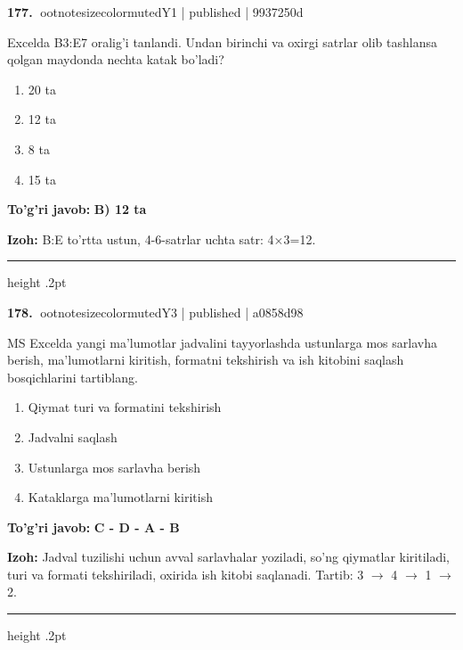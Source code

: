 \documentclass[10pt,a4paper]{article}
\begin{document}
\textbf{\color{ink}177.} {ootnotesizecolor{muted}Y1 | published | 9937250d}
\par
Excelda B3:E7 oralig'i tanlandi. Undan birinchi va oxirgi satrlar olib tashlansa qolgan maydonda nechta katak bo'ladi?
\begin{enumerate}[label=\Alph*),leftmargin=9mm]
\item 20 ta
\item 12 ta
\item 8 ta
\item 15 ta
\end{enumerate}
\begin{tcolorbox}[enhanced,breakable,colback=teal!4,colframe=teal!55!black,boxrule=0.45pt,arc=1.2mm,left=2.8mm,right=2.8mm,top=2mm,bottom=2mm]
\textbf{\color{teal}To'g'ri javob:} \textbf{B) 12 ta}
\par\smallskip
\textbf{Izoh:} B:E to'rtta ustun, 4-6-satrlar uchta satr: 4\ensuremath{\times}3=12.
\end{tcolorbox}
\vspace{2mm}\hrule height .2pt\vspace{2mm}

\textbf{\color{ink}178.} {ootnotesizecolor{muted}Y3 | published | a0858d98}
\par
MS Excelda yangi ma'lumotlar jadvalini tayyorlashda ustunlarga mos sarlavha berish, ma'lumotlarni kiritish, formatni tekshirish va ish kitobini saqlash bosqichlarini tartiblang.
\begin{enumerate}[label=\Alph*),leftmargin=9mm]
\item Qiymat turi va formatini tekshirish
\item Jadvalni saqlash
\item Ustunlarga mos sarlavha berish
\item Kataklarga ma'lumotlarni kiritish
\end{enumerate}
\begin{tcolorbox}[enhanced,breakable,colback=teal!4,colframe=teal!55!black,boxrule=0.45pt,arc=1.2mm,left=2.8mm,right=2.8mm,top=2mm,bottom=2mm]
\textbf{\color{teal}To'g'ri javob:} \textbf{C - D - A - B}
\par\smallskip
\textbf{Izoh:} Jadval tuzilishi uchun avval sarlavhalar yoziladi, so'ng qiymatlar kiritiladi, turi va formati tekshiriladi, oxirida ish kitobi saqlanadi. Tartib: 3 \ensuremath{\rightarrow} 4 \ensuremath{\rightarrow} 1 \ensuremath{\rightarrow} 2.
\end{tcolorbox}
\vspace{2mm}\hrule height .2pt\vspace{2mm}
\end{document}
